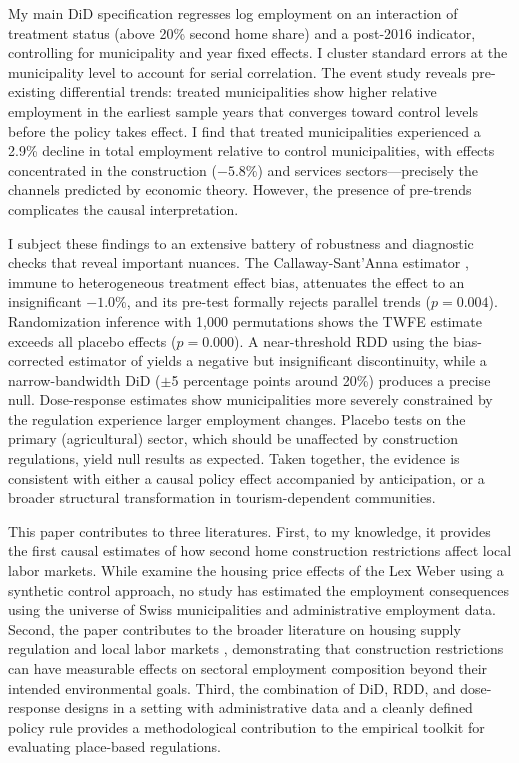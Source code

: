 \documentclass[12pt]{article}
\begin{document}
My main DiD specification regresses log employment on an interaction of treatment status (above 20\% second home share) and a post-2016 indicator, controlling for municipality and year fixed effects. I cluster standard errors at the municipality level to account for serial correlation. The event study reveals pre-existing differential trends: treated municipalities show higher relative employment in the earliest sample years that converges toward control levels before the policy takes effect. I find that treated municipalities experienced a 2.9\% decline in total employment relative to control municipalities, with effects concentrated in the construction ($-5.8\%$) and services sectors---precisely the channels predicted by economic theory. However, the presence of pre-trends complicates the causal interpretation.

I subject these findings to an extensive battery of robustness and diagnostic checks that reveal important nuances. The Callaway-Sant'Anna estimator \citep{callawaysantanna2021}, immune to heterogeneous treatment effect bias, attenuates the effect to an insignificant $-1.0\%$, and its pre-test formally rejects parallel trends ($p = 0.004$). Randomization inference \citep{fisher1935} with 1,000 permutations shows the TWFE estimate exceeds all placebo effects ($p = 0.000$). A near-threshold RDD using the bias-corrected estimator of \citet{calonicoetal2014} yields a negative but insignificant discontinuity, while a narrow-bandwidth DiD ($\pm$5 percentage points around 20\%) produces a precise null. Dose-response estimates show municipalities more severely constrained by the regulation experience larger employment changes. Placebo tests on the primary (agricultural) sector, which should be unaffected by construction regulations, yield null results as expected. Taken together, the evidence is consistent with either a causal policy effect accompanied by anticipation, or a broader structural transformation in tourism-dependent communities.

This paper contributes to three literatures. First, to my knowledge, it provides the first causal estimates of how second home construction restrictions affect local labor markets. While \citet{hilberschoni2020} examine the housing price effects of the Lex Weber using a synthetic control approach, no study has estimated the employment consequences using the universe of Swiss municipalities and administrative employment data. Second, the paper contributes to the broader literature on housing supply regulation and local labor markets \citep{moretti2010, hsiehmoretti2019}, demonstrating that construction restrictions can have measurable effects on sectoral employment composition beyond their intended environmental goals. Third, the combination of DiD, RDD, and dose-response designs in a setting with administrative data and a cleanly defined policy rule provides a methodological contribution to the empirical toolkit for evaluating place-based regulations.
\end{document}
